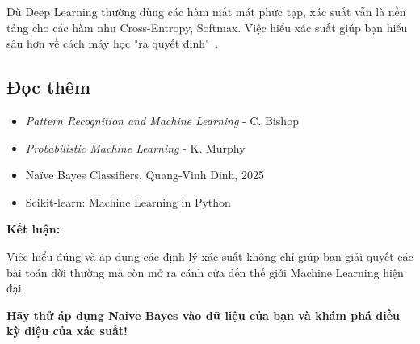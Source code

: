 Dù Deep Learning thường dùng các hàm mất mát phức tạp, xác suất vẫn là nền tảng cho các hàm như Cross-Entropy, Softmax. Việc hiểu xác suất giúp bạn hiểu sâu hơn về cách máy học "ra quyết định"~\cite{murphy2022probabilistic}.

\subsection{Đọc thêm}

\begin{itemize}
    \item \textit{Pattern Recognition and Machine Learning} - C. Bishop~\cite{bishop2006pattern}
    \item \textit{Probabilistic Machine Learning} - K. Murphy~\cite{murphy2022probabilistic}
    \item Naïve Bayes Classifiers, Quang-Vinh Dinh, 2025~\cite{aivietnam2025}
    \item Scikit-learn: Machine Learning in Python~\cite{scikit-learn}
\end{itemize}

\textbf{Kết luận:}

Việc hiểu đúng và áp dụng các định lý xác suất không chỉ giúp bạn giải quyết các bài toán đời thường mà còn mở ra cánh cửa đến thế giới Machine Learning hiện đại.

\textbf{Hãy thử áp dụng Naive Bayes vào dữ liệu của bạn và khám phá điều kỳ diệu của xác suất!}